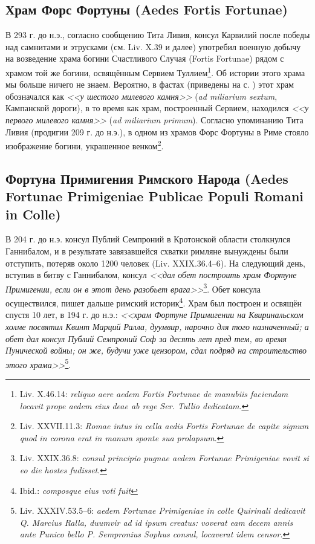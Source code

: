 \subsection{Храм Форс Фортуны (Aedes Fortis Fortunae)}\label{FortisFortunae2}

В 293 г. до н.э., согласно сообщению Тита Ливия, консул Карвилий после победы над самнитами и этрусками (см. Liv. X.39 и далее) употребил военную добычу на возведение храма богини Счастливого Случая (Fortis Fortunae) рядом с храмом той же богини, освящённым Сервием Туллием\footnote{Liv. X.46.14: \textit{reliquo aere aedem Fortis Fortunae de manubiis faciendam locavit prope aedem eius deae ab rege Ser. Tullio dedicatam}.}. Об истории этого храма мы больше ничего не знаем. Вероятно, в фастах (приведены на с. \pageref{Fastae}) этот храм обозначался как \textit{<<у шестого милевого камня>>} (\textit{ad miliarium sextum}, Кампанской дороги), в то время как храм, построенный Сервием, находился \textit{<<у первого милевого камня>>} (\textit{ad miliarium primum}). Согласно упоминанию Тита Ливия (продигии 209 г. до н.э.), в одном из храмов Форс Фортуны в Риме стояло изображение богини, украшенное венком\footnote{Liv. XXVII.11.3: \textit{Romae intus in cella aedis Fortis Fortunae de capite signum quod in corona erat in manum sponte sua prolapsum}.}.

\subsection{Фортуна Примигения Римского Народа (Aedes Fortunae Primigeniae Publicae Populi Romani in Colle)}\label{FortunaPublicaPrimigenia}

В 204 г. до н.э. консул Публий Семпроний в Кротонской области столкнулся Ганнибалом, и в результате завязавшейся схватки римляне вынуждены были отступить, потеряв около 1200 человек (Liv. XXIX.36.4--6). На следующий день, вступив в битву с Ганнибалом, консул \textit{<<дал обет построить храм Фортуне Примигении, если он в этот день разобьет врага>>}\footnote{Liv. XXIX.36.8: \textit{consul principio pugnae aedem Fortunae Primigeniae vovit si eo die hostes fudisset}.}. Обет консула осуществился, пишет дальше римский историк\footnote{Ibid.: \textit{composque eius voti fuit}}. Храм был построен и освящён спустя 10 лет, в 194 г. до н.э.: \textit{<<храм Фортуне Примигении на Квиринальском холме посвятил Квинт Марций Ралла, дуумвир, нарочно для того назначенный; а обет дал консул Публий Семпроний Соф за десять лет пред тем, во время Пунической войны; он же, будучи уже цензором, сдал подряд на строительство этого храма>>}\footnote{Liv. XXXIV.53.5--6: \textit{aedem Fortunae Primigeniae in colle Quirinali dedicavit Q. Marcius Ralla, duumvir ad id ipsum creatus: voverat eam decem annis ante Punico bello P. Sempronius Sophus consul, locaverat idem censor}.}.

